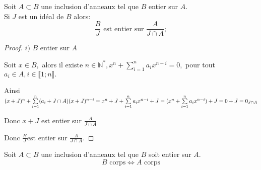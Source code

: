 \begin{maproposition}
	Soit $A \subset B$ une inclusion d'anneaux tel que $B$ entier sur $A$.\\
		Si $J$ est un idéal de $B$ alors:
		\[ \dfrac{B}{J} \text{ est entier sur } \dfrac{A}{J \cap A};\]

\end{maproposition}

\begin{proof}
	$i)$ $B$ entier sur $A$ 
	
	Soit $x\in B,$ alors il existe $n\in \mathbb{N}^{\ast },x^{n}+\sum\limits_{i=1}^{n}a_{i}x^{n-i}=0,$ pour tout $a_{i}\in
	A,i\in \llbracket 1; n \rrbracket.$
	
	Ainsi $(x+J)^{n}+\sum\limits_{i=1}^{n}(a_{i}+J\cap
	A)(x+J)^{n-i}=x^{n}+J+\sum\limits_{i=1}^{n}a_{i}x^{n-i}+J=\\
	(x^{n}+\sum\limits_{i=1}^{n}a_{i}x^{n-i})+J=0+J=0_{J\cap A}$
	
	Donc $x+J$ est entier sur $\frac{A}{J\cap A}$
	
	Donc $\frac{B}{J}$est entier sur $\frac{A}{J\cap A}.$
	
	
	
%	
%	
%	
%	
%	
\end{proof}
\begin{maproposition}
	Soit $A \subset B$ une inclusion d'anneaux tel que $B$ soit entier sur $A$.
	\[ B \text{ corps} \Longleftrightarrow  A \text{ corps} \]
\end{maproposition}
